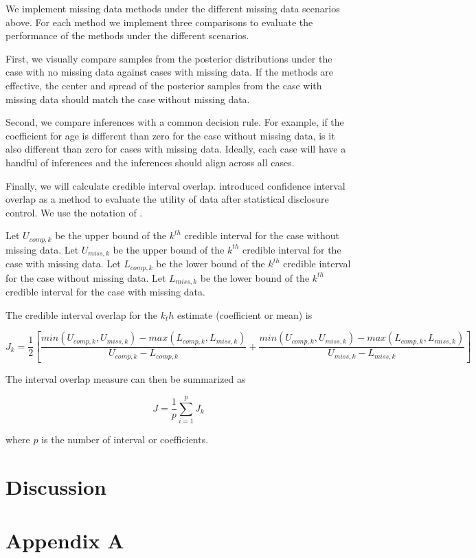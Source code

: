 \documentclass[11pt]{article}
\begin{document}
We implement missing data methods under the different missing data scenarios above. For each method we implement three comparisons to evaluate the performance of the methods under the different scenarios. 

First, we visually compare samples from the posterior distributions under the case with no missing data against cases with missing data. If the methods are effective, the center and spread of the posterior samples from the case with missing data should match the case without missing data. 

Second, we compare inferences with a common decision rule. For example, if the coefficient for age is different than zero for the case without missing data, is it also different than zero for cases with missing data. Ideally, each case will have a handful of inferences and the inferences should align across all cases. 

Finally, we will calculate credible interval overlap. \cite{Karr2006} introduced confidence interval overlap as a method to evaluate the utility of data after statistical disclosure control. We use the notation of \cite{Snoke2018}.

Let $U_{comp,k}$ be the upper bound of the $k^{th}$ credible interval for the case without missing data. Let $U_{miss,k}$ be the upper bound of the $k^{th}$ credible interval for the case with missing data. Let $L_{comp,k}$ be the lower bound of the $k^{th}$ credible interval for the case without missing data. Let $L_{miss,k}$ be the lower bound of the $k^{th}$ credible interval for the case with missing data. 

The credible interval overlap for the $k_th$ estimate (coefficient or mean) is 

$$J_k = \frac{1}{2}\left[\frac{min(U_{comp,k}, U_{miss,k}) - max(L_{comp,k}, L_{miss,k})}{U_{comp,k} - L_{comp,k}} + \frac{min(U_{comp,k}, U_{miss,k}) - max(L_{comp,k}, L_{miss,k})}{U_{miss,k} - L_{miss,k}}\right]$$

The interval overlap measure can then be summarized as 

$$J = \frac{1}{p}\sum_{i = 1}^pJ_k$$

where $p$ is the number of interval or coefficients. 

\section{Discussion}

\newpage
\section{Appendix A}
\end{document}
